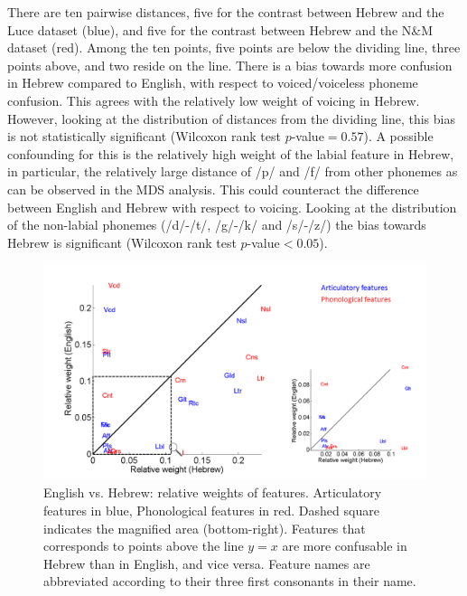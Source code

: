 There are ten pairwise distances, five for the contrast between Hebrew and the Luce dataset (blue), and five for the contrast between Hebrew and the N\&M dataset (red). Among the ten points, five points are below the dividing line, three points above, and two reside on the line. There is a bias towards more confusion in Hebrew compared to English, with respect to voiced/voiceless phoneme confusion. This agrees with the relatively low weight of voicing in Hebrew. However, looking at the distribution of distances from the dividing line, this bias is not statistically significant (Wilcoxon rank test $p$-value$=0.57$). A possible confounding for this is the relatively high weight of the labial feature in Hebrew, in particular, the relatively large distance of /p/ and /f/ from other phonemes as can be observed in the MDS analysis. This could counteract the difference between English and Hebrew with respect to voicing. Looking at the distribution of the non-labial phonemes (/d/-/t/, /g/-/k/ and /s/-/z/) the bias towards Hebrew is significant (Wilcoxon rank test $p$-value$<0.05$).

\begin{figure} [H]
\vspace{.3in}
\includegraphics[width=\linewidth]{Figures/Ch2/compare_Heb_Luce.PNG}
\caption{English vs. Hebrew: relative weights of features. Articulatory features in blue, Phonological features in red. Dashed square indicates the magnified area (bottom-right). Features that corresponds to points above the line $y=x$ are more confusable in Hebrew than in English, and vice versa. Feature names are abbreviated according to their three first consonants in their name.}
\end{figure}